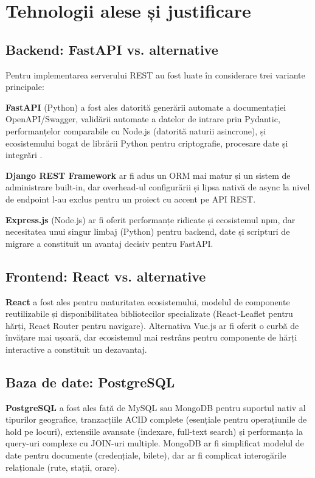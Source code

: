 \documentclass[12pt,a4paper]{report}
\begin{document}
\section{Tehnologii alese și justificare}

\subsection{Backend: FastAPI vs. alternative}

Pentru implementarea serverului REST au fost luate în considerare trei variante principale:

\textbf{FastAPI} (Python) a fost ales datorită generării automate a documentației OpenAPI/Swagger, validării automate a datelor de intrare prin Pydantic, performanțelor comparabile cu Node.js (datorită naturii asincrone), și ecosistemului bogat de librării Python pentru criptografie, procesare date și integrări \cite{fastapi2023}.

\textbf{Django REST Framework} ar fi adus un ORM mai matur și un sistem de administrare built-in, dar overhead-ul configurării și lipsa nativă de async la nivel de endpoint l-au exclus pentru un proiect cu accent pe API REST.

\textbf{Express.js} (Node.js) ar fi oferit performanțe ridicate și ecosistemul npm, dar necesitatea unui singur limbaj (Python) pentru backend, date și scripturi de migrare a constituit un avantaj decisiv pentru FastAPI.

\subsection{Frontend: React vs. alternative}

\textbf{React} a fost ales pentru maturitatea ecosistemului, modelul de componente reutilizabile și disponibilitatea bibliotecilor specializate (React-Leaflet pentru hărți, React Router pentru navigare). Alternativa Vue.js ar fi oferit o curbă de învățare mai ușoară, dar ecosistemul mai restrâns pentru componente de hărți interactive a constituit un dezavantaj.

\subsection{Baza de date: PostgreSQL}

\textbf{PostgreSQL} a fost ales față de MySQL sau MongoDB pentru suportul nativ al tipurilor geografice, tranzacțiile ACID complete (esențiale pentru operațiunile de hold pe locuri), extensiile avansate (indexare, full-text search) și performanța la query-uri complexe cu JOIN-uri multiple. MongoDB ar fi simplificat modelul de date pentru documente (credențiale, bilete), dar ar fi complicat interogările relaționale (rute, stații, orare).
\end{document}
